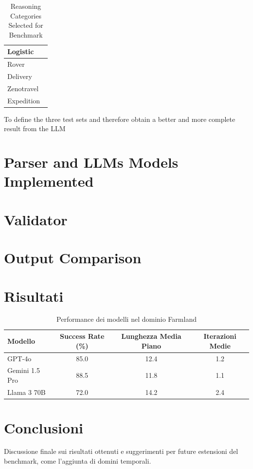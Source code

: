 \documentclass[a4paper]{article}
\begin{document}
\begin{table}[H]
    \begin{minipage}[t]{0.31\textwidth}
        \centering
        \begin{tabular}[t]{ >{\centering\arraybackslash}p{0.9\linewidth} }
            \toprule
            \textbf{Logistic}\\
            \midrule[1pt]
            \addlinespace[0.15cm]
            Rover\\
            \midrule
            Delivery\\
            \midrule
            Zenotravel\\
            \midrule
            Expedition\\
            \bottomrule
        \end{tabular}
    \end{minipage}

    \vspace{0.4cm}
    \caption{Reasoning Categories Selected for Benchmark}
    \label{tab:tre_tabelle_affiancate}
\end{table}
To define the three test sets and therefore obtain a better and more complete result from the LLM  

\section{Parser and LLMs Models Implemented}


\section{Validator}


\section{Output Comparison}


\section{Risultati}
\begin{table}[h]
    \centering
    \caption{Performance dei modelli nel dominio Farmland}
    \begin{tabular}{lccc}
        \toprule
        Modello & Success Rate (\%) & Lunghezza Media Piano & Iterazioni Medie \\
        \midrule
        GPT-4o & 85.0 & 12.4 & 1.2 \\
        Gemini 1.5 Pro & 88.5 & 11.8 & 1.1 \\
        Llama 3 70B & 72.0 & 14.2 & 2.4 \\
        \bottomrule
    \end{tabular}
\end{table}

\section{Conclusioni}
Discussione finale sui risultati ottenuti e suggerimenti per future estensioni del benchmark, come l'aggiunta di domini temporali.


\end{document}
